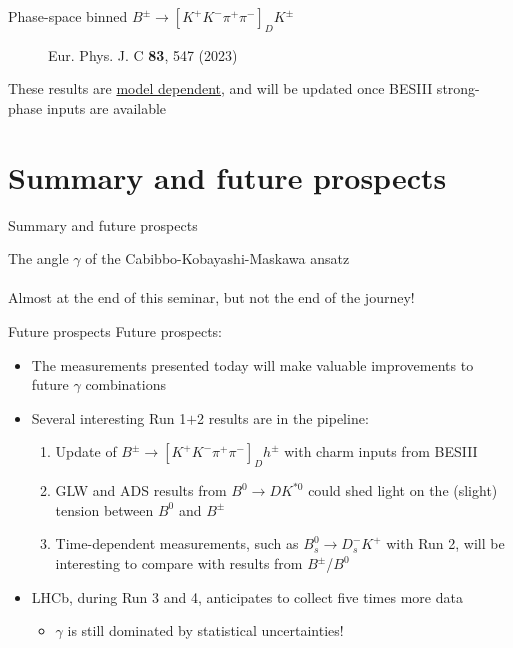 \documentclass[dvipsnames]{beamer}
\begin{document}
\begin{frame}{Phase-space binned $B^\pm\to[K^+K^-\pi^+\pi^-]_DK^\pm$}
\begin{figure}[htb]
\begin{subfigure}{0.5\textwidth}
    \end{subfigure}
    \vspace{-0.5cm}
    \caption*{\tiny Eur. Phys. J. C \textbf{83}, 547 (2023)}
  \end{figure}
  \vspace{-0.5cm}
  \begin{center}
    {\large These results are \underline{model dependent}, and will be updated once BESIII strong-phase inputs are available}
  \end{center}
\end{frame}

\section{Summary and future prospects}
\begin{frame}{Summary and future prospects}
  \begin{center}
    {\huge The angle $\gamma$ of the Cabibbo-Kobayashi-Maskawa ansatz} \\~\\
    {\large Almost at the end of this seminar, but not the end of the journey!}
  \end{center}
\end{frame}

\begin{frame}{Future prospects}
  \vspace{0.0cm}
  {\Large Future prospects:}
  \vspace{0.3cm}
  \begin{itemize}
    \setlength\itemsep{1.0em}
    \item{The measurements presented today will make valuable improvements to future $\gamma$ combinations}
    \item{Several interesting Run 1$+$2 results are in the pipeline:}
    \begin{enumerate}
      \setlength\itemsep{0.3em}
      \item{Update of $B^\pm\to[K^+K^-\pi^+\pi^-]_Dh^\pm$ with charm inputs from BESIII}
      \item{GLW and ADS results from $B^0\to DK^{*0}$ could shed light on the (slight) tension between $B^0$ and $B^\pm$}
      \item{Time-dependent measurements, such as $B_s^0\to D_s^-K^+$ with Run 2, will be interesting to compare with results from $B^\pm$/$B^0$}
    \end{enumerate}
    \item{LHCb, during Run 3 and 4, anticipates to collect five times more data}
    \begin{itemize}
      \item{$\gamma$ is still dominated by statistical uncertainties!}
    \end{itemize}
  \end{itemize}
\end{frame}
\end{document}
